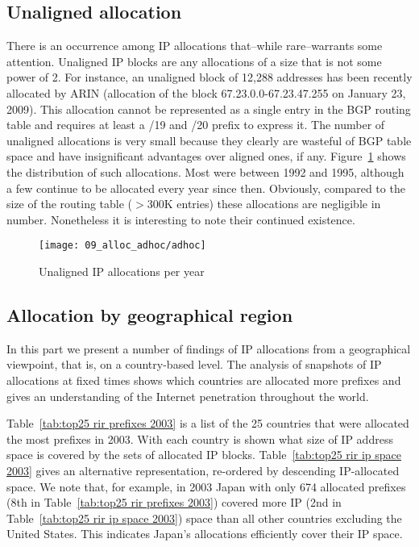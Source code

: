 \subsection{Unaligned allocation}

There is an occurrence among IP allocations that--while rare--warrants some
attention. Unaligned IP blocks are any allocations of a size that is not some
power of 2. For instance, an unaligned block of 12,288 addresses has been
recently allocated by ARIN (allocation of the block 67.23.0.0-67.23.47.255 on
January 23, 2009). This allocation cannot be represented as a single entry in
the BGP routing table and requires at least a /19 and /20 prefix to express it.
The number of unaligned allocations is very small because they clearly are
wasteful of BGP table space and have insignificant advantages over aligned
ones, if any. Figure~\ref{fig:unaligned IP allocations} shows the distribution
of such allocations. Most were between 1992 and 1995, although a few continue
to be allocated every year since then. Obviously, compared to the size of the
routing table ($>$300K entries) these allocations are negligible in number.
Nonetheless it is interesting to note their continued existence.

\begin{figure}[htbp]
 	\centering
 		\texttt{[image: 09\_alloc\_adhoc/adhoc]}
	\caption{Unaligned IP allocations per year}
 	\label{fig:unaligned IP allocations}
\end{figure}

\subsection{Allocation by geographical region}

In this part we present a number of findings of IP allocations from a 
geographical viewpoint, that is, on a country-based level. The analysis of 
snapshots of IP allocations at fixed times shows which countries are 
allocated more prefixes and gives an understanding of the Internet penetration 
throughout the world.

Table~\ref{tab:top25 rir prefixes 2003} is a list of the 25 countries that 
were allocated the most prefixes in 2003.  With each country is shown what 
size of IP address space is covered by the sets of allocated IP blocks.
Table~\ref{tab:top25 rir ip space 2003} gives an alternative representation, 
re-ordered by descending IP-allocated space.  We note that, for example, 
in 2003 Japan with only 674 allocated prefixes (8th in 
Table~\ref{tab:top25 rir prefixes 2003}) covered more IP (2nd in 
Table~\ref{tab:top25 rir ip space 2003}) space than all other countries 
excluding the United States.  This indicates Japan's allocations efficiently 
cover their IP space.

